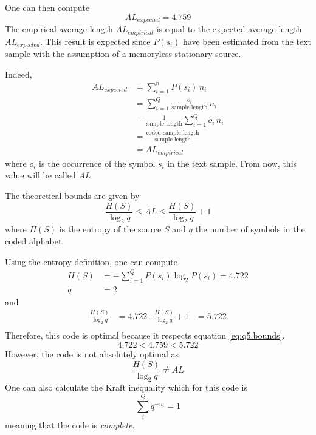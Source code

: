 \documentclass[a4paper, 12pt]{article}
\begin{document}
\begin{enumerate}[leftmargin=*]
        One can then compute
        \begin{equation*}
            AL_{expected} = \num{4.759}
        \end{equation*}
        The empirical average length $AL_{empirical}$ is equal to the expected average length $AL_{expected}$. This result is expected since $P(s_i)$ have been estimated from the text sample with the assumption of a memoryless stationary source.
        
        Indeed,
        \begin{align*}
            AL_{expected} & = \sum_{i=1}^{n} P(s_i) \, n_i \\
            & = \sum_{i=1}^{Q} \frac{o_i}{\text{sample length}} \, n_i \\
            & = \frac{1}{\text{sample length}} \sum_{i=1}^{Q} o_i \, n_i \\
            & = \frac{\text{coded sample length}}{\text{sample length}} \\
            & = AL_{empirical}
        \end{align*}
        where $o_i$ is the occurrence of the symbol $s_i$ in the text sample. From now, this value will be called $AL$.
        
        The theoretical bounds are given by
        \begin{equation}\label{eq:q5.bounds}
            \frac{H(S)}{\log_2 q} \leq AL \leq \frac{H(S)}{\log_2 q} + 1
        \end{equation}
        where $H(S)$ is the entropy of the source $S$ and $q$ the number of symbols in the coded alphabet.
        
        Using the entropy definition, one can compute
        \begin{align*}
            H(S) &= -\sum_{i=1}^{Q} P(s_i) \log_2 P(s_i) = \num{4.722}\\
            q &= 2
        \end{align*}
        and
        \begin{align*}
            \frac{H(S)}{\log_2 q} &= \num{4.722} & \frac{H(S)}{\log_2 q} + 1 &= \num{5.722} \\
        \end{align*}
        Therefore, this code is optimal because it respects equation \eqref{eq:q5.bounds}.
        \begin{equation*}
            \num{4.722} < \num{4.759} < \num{5.722}
        \end{equation*}
        However, the code is not absolutely optimal as
        \begin{equation*}
            \frac{H(S)}{\log_2 q} \neq AL
        \end{equation*}
        One can also calculate the Kraft inequality which for this code is
        $$
        \sum_i^Q q^{-n_i} = 1
        $$
        meaning that the code is \emph{complete}.
        

\end{enumerate}
\end{document}
